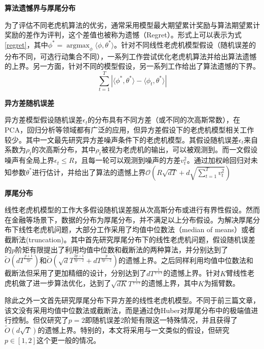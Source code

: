 \documentclass[UTF8,a4paper,10.5pt]{ctexart}
\newcommand{\Ocal}{\mathcal O}
\newcommand{\argmax}{\mathop{\arg\max}}
\begin{document}
\textbf{算法遗憾界与厚尾分布}

为了评估不同老虎机算法的优劣，通常采用模型最大期望累计奖励与算法期望累计奖励的差作为评判，这个差值也被称为遗憾（Regret）。形式上可以表示为式\ref{regret}，其中$\phi^* = \argmax_{\phi}\langle \phi,\theta^* \rangle$。针对不同线性老虎机模型假设（随机误差的分布不同，可选行动集合不同），一系列工作尝试优化老虎机算法并给出算法遗憾的上界。另一方面，针对不同的模型假设，另一系列工作给出了算法遗憾的下界。
\begin{equation}
	\sum_{t=1}^T |\langle \phi^*, \theta^* \rangle - \langle\phi_t, \theta^*\rangle|
	\label{regret}
\end{equation}

\textbf{异方差随机误差}

异方差模型假设随机误差$\epsilon_t$的分布具有不同方差（或不同的次高斯常数），在PCA，回归分析等领域都有广泛的应用，但异方差假设下的老虎机模型相关工作较少\cite{GFApaper}。其中\cite{First_Heteroscedastic}一文最先研究异方差噪声条件下的老虎机模型。其假设随机误差$\epsilon_t$来自系数为$\rho_t$的次高斯分布，其中$\rho_t$被视为老虎机的输出，可以被观测到。而\cite{Zhou21}一文假设噪声有全局上界$\epsilon_t\leq R$，且每一轮可以观测到噪声的方差$v^2_t$。通过加权岭回归对未知参数$\theta^*$进行估计，并给出了算法的遗憾上界$\Ocal\left(R\sqrt{dT}+d\sqrt{\sum_{t=1}^{T}v_t^2}\right)$

\textbf{厚尾分布}

线性老虎机模型的工作大多假设随机误差服从次高斯分布或进行有界性假设。然而在金融等场景下，数据的分布为厚尾分布，并不满足以上分布假设。为解决厚尾分布下线性老虎机问题，大部分工作采用了均值中位数法（median of means）或者截断法(truncation)。其中\cite{Medina16}首先研究厚尾分布下的线性老虎机问题，假设随机误差的$p$阶矩有限提出了利用均值中位数和截断法的两种算法，并分别达到了$\tilde{O}(dT^{\frac{p+1}{2p}})$和$\tilde{O}(\sqrt{d}T^{\frac{2p-1}{3p-2}}+dT^{\frac{p}{3p-2}})$的遗憾上界。之后\cite{Shao18}同样利用均值中位数法和截断法但采用了更加精细的设计，分别达到了$dT^{\frac{1}{1+\epsilon}}$的遗憾上界。\cite{Xue20}针对$K$臂线性老虎机做了进一步算法优化，达到了$\sqrt{dK}T^{\frac{1}{1+\epsilon}}$的遗憾上界，其中$K$为摇臂数。

除此之外\cite{Xiang23}一文首先研究厚尾分布下异方差的线性老虎机模型。不同于前三篇文章，该文没有采用均值中位数法或截断法，而是通过伪Huber对厚尾分布中的极端值进行控制。但仅研究了$p=2$即随机误差2阶矩有限这一特殊情况，并且获得了$\tilde{O}(d\sqrt{T})$的遗憾上界。特别的，本文将采用与\cite{Xiang23}一文类似的假设，但研究$p\in [1,2]$这个更一般的情况。
\end{document}
